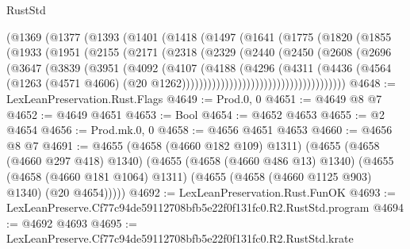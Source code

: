 \begin{lexlean}{RustStd}
\begin{coremodule}
                (@1369
                  (@1377
                    (@1393
                      (@1401
                        (@1418
                          (@1497
                            (@1641
                              (@1775
                                (@1820
                                  (@1855
                                    (@1933
                                      (@1951
                                        (@2155
                                          (@2171
                                            (@2318
                                              (@2329
                                                (@2440
                                                  (@2450
                                                    (@2608
                                                      (@2696
                                                        (@3647
                                                          (@3839
                                                            (@3951
                                                              (@4092
                                                                (@4107
                                                                  (@4188
                                                                    (@4296
                                                                      (@4311
                                                                        (@4436
                                                                          (@4564
                                                                            (@1263
                                                                              (@4571 @4606)
                                                                              (@20
                                                                                @1262))))))))))))))))))))))))))))))))))))))
@4648 := LexLeanPreservation.Rust.Flags
@4649 := Prod.{0, 0}
@4651 := @4649 @8 @7
@4652 := @4649 @4651
@4653 := Bool
@4654 := @4652 @4653
@4655 := @2 @4654
@4656 := Prod.mk.{0, 0}
@4658 := @4656 @4651 @4653
@4660 := @4656 @8 @7
@4691 := @4655
    (@4658 (@4660 @182 @109) @1311)
    (@4655
      (@4658 (@4660 @297 @418) @1340)
      (@4655
        (@4658 (@4660 @486 @13) @1340)
        (@4655
          (@4658 (@4660 @181 @1064) @1311)
          (@4655 (@4658 (@4660 @1125 @903) @1340) (@20 @4654)))))
@4692 := LexLeanPreservation.Rust.FunOK
@4693 := LexLeanPreserve.Cf77c94de59112708bfb5e22f0f131fc0.R2.RustStd.program
@4694 := @4692 @4693
@4695 := LexLeanPreserve.Cf77c94de59112708bfb5e22f0f131fc0.R2.RustStd.krate

\end{coremodule}
\end{lexlean}
